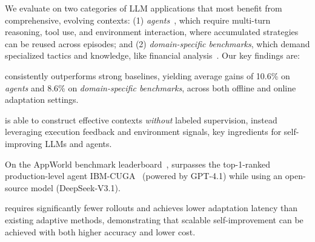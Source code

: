 We evaluate \name on two categories of LLM applications that most benefit from comprehensive, evolving contexts:
(1) \emph{agents}~\citep{trivedi2024appworld}, which require multi-turn reasoning, tool use, and environment interaction, where accumulated strategies can be reused across episodes; and
(2) \emph{domain-specific benchmarks}, which demand specialized tactics and knowledge, like financial analysis~\citep{loukas2022finer, wang2025finlora}.
Our key findings are:
\begin{packeditemize}
    \item \name consistently outperforms strong baselines, yielding average gains of 10.6\% on \textit{agents} and 8.6\% on \textit{domain-specific benchmarks}, across both offline and online adaptation settings.
    \item \name is able to construct effective contexts \textit{without} labeled supervision, instead leveraging execution feedback and environment signals, key ingredients for self-improving LLMs and agents.
    \item On the AppWorld benchmark leaderboard~\citep{AppWorldLeaderboard}, \name surpasses the top-1-ranked production-level agent IBM-CUGA~\citep{marreed2025towards} (powered by GPT-4.1) while using an open-source model (DeepSeek-V3.1).
    \item \name requires significantly fewer rollouts and achieves lower adaptation latency than existing adaptive methods, demonstrating that scalable self-improvement can be achieved with both higher accuracy and lower cost.
\end{packeditemize}